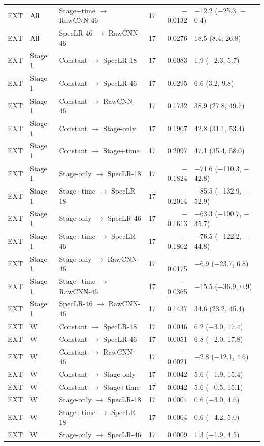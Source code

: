 {{\begin{longtable}{@{}lllrrl@{}}
EXT & All & Stage+time $\to$ RawCNN-46 & 17 & $-$0.0132 & $-$12.2 ($-$25.3, $-$0.4) \\
EXT & All & SpecLR-46 $\to$ RawCNN-46 & 17 & 0.0276 & 18.5 (8.4, 26.8) \\
\addlinespace[1pt]
EXT & Stage 1 & Constant $\to$ SpecLR-18 & 17 & 0.0083 & 1.9 ($-$2.3, 5.7) \\
EXT & Stage 1 & Constant $\to$ SpecLR-46 & 17 & 0.0295 & 6.6 (3.2, 9.8) \\
EXT & Stage 1 & Constant $\to$ RawCNN-46 & 17 & 0.1732 & 38.9 (27.8, 49.7) \\
EXT & Stage 1 & Constant $\to$ Stage-only & 17 & 0.1907 & 42.8 (31.1, 53.4) \\
EXT & Stage 1 & Constant $\to$ Stage+time & 17 & 0.2097 & 47.1 (35.4, 58.0) \\
EXT & Stage 1 & Stage-only $\to$ SpecLR-18 & 17 & $-$0.1824 & $-$71.6 ($-$110.3, $-$42.8) \\
EXT & Stage 1 & Stage+time $\to$ SpecLR-18 & 17 & $-$0.2014 & $-$85.5 ($-$132.9, $-$52.9) \\
EXT & Stage 1 & Stage-only $\to$ SpecLR-46 & 17 & $-$0.1613 & $-$63.3 ($-$100.7, $-$35.7) \\
EXT & Stage 1 & Stage+time $\to$ SpecLR-46 & 17 & $-$0.1802 & $-$76.5 ($-$122.2, $-$44.8) \\
EXT & Stage 1 & Stage-only $\to$ RawCNN-46 & 17 & $-$0.0175 & $-$6.9 ($-$23.7, 6.8) \\
EXT & Stage 1 & Stage+time $\to$ RawCNN-46 & 17 & $-$0.0365 & $-$15.5 ($-$36.9, 0.9) \\
EXT & Stage 1 & SpecLR-46 $\to$ RawCNN-46 & 17 & 0.1437 & 34.6 (23.2, 45.4) \\
\addlinespace[1pt]
EXT & W & Constant $\to$ SpecLR-18 & 17 & 0.0046 & 6.2 ($-$3.0, 17.4) \\
EXT & W & Constant $\to$ SpecLR-46 & 17 & 0.0051 & 6.8 ($-$2.0, 17.8) \\
EXT & W & Constant $\to$ RawCNN-46 & 17 & $-$0.0021 & $-$2.8 ($-$12.1, 4.6) \\
EXT & W & Constant $\to$ Stage-only & 17 & 0.0042 & 5.6 ($-$1.9, 15.4) \\
EXT & W & Constant $\to$ Stage+time & 17 & 0.0042 & 5.6 ($-$0.5, 15.1) \\
EXT & W & Stage-only $\to$ SpecLR-18 & 17 & 0.0004 & 0.6 ($-$3.0, 4.6) \\
EXT & W & Stage+time $\to$ SpecLR-18 & 17 & 0.0004 & 0.6 ($-$4.2, 5.0) \\
EXT & W & Stage-only $\to$ SpecLR-46 & 17 & 0.0009 & 1.3 ($-$1.9, 4.5) \\

\end{longtable}}}
